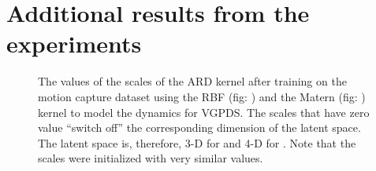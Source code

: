 \section{Additional results from the experiments}
\begin{figure}[ht]
\begin{center}
\end{center}
\caption{\small{
The values of the scales of the ARD kernel after training on the motion capture dataset using the RBF (fig: ) and the Matern (fig: ) kernel to model the dynamics for VGPDS. The scales that have zero value ``switch off'' the corresponding dimension of the latent space. The latent space is, therefore, 3-D for  and 4-D for . Note that the scales were initialized with very similar values.
}
}
\label{fig:supplMocap1}
\end{figure}


